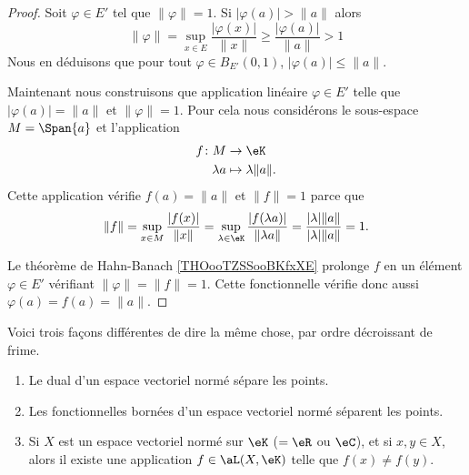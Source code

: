 	\begin{proof}
		Soit \( \varphi\in E'\) tel que \( \| \varphi \|=1\). Si \( | \varphi(a) |>\| a \|\) alors
		\begin{equation}
			\| \varphi \|=\sup_{x\in E}\frac{ | \varphi(x) | }{ \| x \| }\geq \frac{ | \varphi(a) | }{ \| a \| }>1
		\end{equation}
		Nous en déduisons que pour tout \( \varphi\in B_{E'}(0,1)\), \( | \varphi(a) |\leq \|a  \|\).

		Maintenant nous construisons que application linéaire \( \varphi\in E'\) telle que \( | \varphi(a) |=\| a \|\) et \( \| \varphi \|=1\). Pour cela nous considérons le sous-espace \( M=\Span\{ a \}\) et l'application
		\begin{equation}
			\begin{aligned}
				f\colon M & \to \eK                 \\
				\lambda a & \mapsto \lambda\| a \|.
			\end{aligned}
		\end{equation}
		Cette application vérifie \( f(a)=\| a \|\) et \( \| f\|=1\) parce que
		\begin{equation}
			\| f \|=\sup_{x\in M}\frac{ | f(x) | }{ \| x \| }=\sup_{\lambda\in\eK}\frac{ | f(\lambda a) | }{ \| \lambda a \| }=\frac{ | \lambda |\| a \| }{ | \lambda |\| a \| }=1.
		\end{equation}

		Le théorème de Hahn-Banach \ref{THOooTZSSooBKfxXE} prolonge \( f\) en un élément \( \varphi\in E'\) vérifiant \( \| \varphi \|=\| f \|=1\). Cette fonctionnelle vérifie donc aussi \( \varphi(a)=f(a)=\| a \|\).
	\end{proof}

	\begin{corollary}        \label{CORooOBDHooJpiBrs}
		Voici trois façons différentes de dire la même chose, par ordre décroissant de frime.
		\begin{enumerate}
			\item
			      Le dual d'un espace vectoriel normé sépare les points.
			\item
			      Les fonctionnelles bornées d'un espace vectoriel normé séparent les points.
			\item
			      Si \( X\) est un espace vectoriel normé sur \( \eK\) (\( =\eR\) ou \( \eC\)), et si \( x,y\in X\), alors il existe une application \( f\in\aL(X,\eK)\) telle que \( f(x)\neq f(y)\).
		\end{enumerate}
	\end{corollary}

